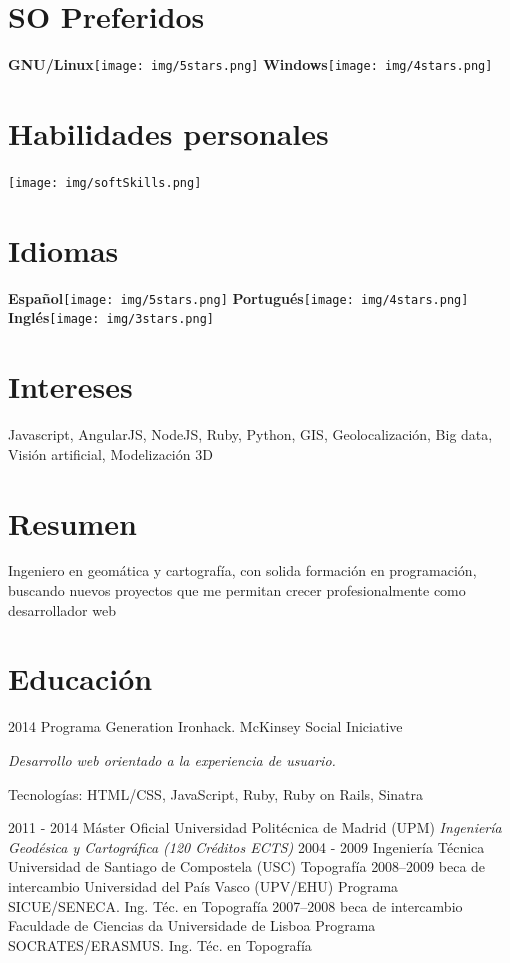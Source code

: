 \documentclass[]{friggeri-cv}
\begin{document}
\begin{aside}
  \section{SO Preferidos}
    \textbf{GNU/Linux}\texttt{[image: img/5stars.png]}
    \textbf{Windows}\texttt{[image: img/4stars.png]}
    ~
  \section{Habilidades personales}
    \texttt{[image: img/softSkills.png]}
    ~

  \section{Idiomas}
    \textbf{Español}\texttt{[image: img/5stars.png]}
    \textbf{Portugués}\texttt{[image: img/4stars.png]}
    \textbf{Inglés}\texttt{[image: img/3stars.png]}
\end{aside}

\section{Intereses}

Javascript, AngularJS, NodeJS, Ruby, Python, GIS, Geolocalización, Big data, Visión artificial, Modelización 3D

\section{Resumen}
Ingeniero en geomática y cartografía, con solida formación en programación, buscando nuevos proyectos que me permitan crecer profesionalmente como desarrollador web


\section{Educación}

\begin{entrylist}
  \entry
    {2014}
    {Programa Generation }
    {Ironhack. McKinsey Social Iniciative}
    {\emph{Desarrollo web orientado a la experiencia de usuario.} \par Tecnologías: HTML/CSS, JavaScript, Ruby, Ruby on Rails, Sinatra}
  \entry    
    {2011 - 2014}
    {Máster Oficial}
    {Universidad Politécnica de Madrid (UPM)}
    {\emph{Ingeniería Geodésica y Cartográfica (120 Créditos ECTS)}}
  \entry
    {2004 - 2009}
    {Ingeniería Técnica}
    {Universidad de Santiago de Compostela (USC)}
    {Topografía}
  \entry
    {2008–2009}
    {beca de intercambio}
    {Universidad del País Vasco (UPV/EHU)}
    {Programa SICUE/SENECA. Ing. Téc. en Topografía}
  \entry
    {2007–2008}
    {beca de intercambio}
    {Faculdade de Ciencias da Universidade de Lisboa}
    {Programa SOCRATES/ERASMUS. Ing. Téc. en Topografía}
\end{entrylist}
\end{document}
